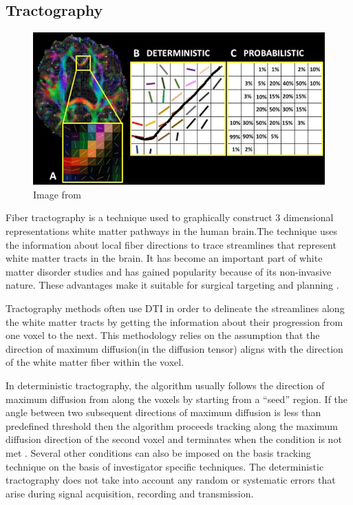 \documentclass[msthesis.tex]{subfiles}
\begin{document}
\subsection{Tractography}
\label{sub:tractography}
\begin{figure}
    \centering
    \includegraphics[width=\textwidht]{images/A-Degree-of-anisotropy-B-Deterministic-fiber-tracking-the-fiber-path-across-voxels-is.png}
    \caption{Image from \cite{muller2018clinically}}
    \label{fig:tracking}
\end{figure}
Fiber tractography is a technique used to graphically construct  3 dimensional representations white matter pathways in the human brain.The technique uses the information about local fiber directions to trace streamlines that represent white matter tracts in the brain. It has become an important part of white matter disorder studies and has gained popularity because of its non-invasive nature. These advantages make it suitable for surgical targeting and planning \cite{romano2009pre}.

Tractography methods often use DTI in order to delineate the streamlines along the white matter tracts by getting the information about their progression from one voxel to the next. This methodology relies on the assumption that the direction of maximum diffusion(in the diffusion tensor) aligns with the direction of the white matter fiber within the voxel. 

In deterministic tractography, the algorithm usually follows the direction of maximum diffusion from along the voxels by starting from a “seed” region. If the angle between two subsequent directions of maximum diffusion is less than predefined threshold then the algorithm proceeds tracking along the maximum diffusion direction of the second voxel and terminates when the condition is not met \cite{}.  Several other conditions can also be imposed on the basis tracking technique on the basis of investigator specific techniques. The deterministic tractography does not take into account any random or systematic errors that arise during signal acquisition, recording and transmission.
\end{document}

